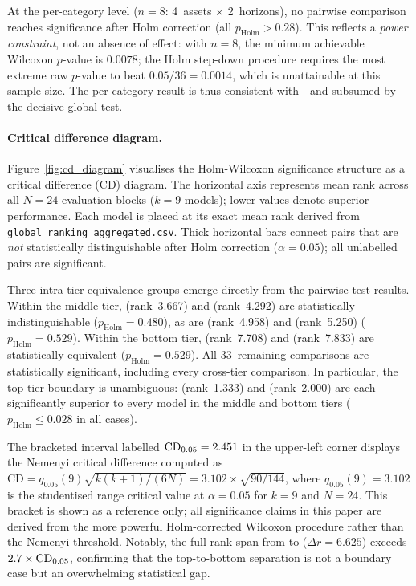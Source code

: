 At the per-category level ($n = 8$: 4~assets $\times$ 2~horizons), no pairwise comparison reaches significance after Holm correction (all $p_\text{Holm} > 0.28$).  This reflects a \emph{power constraint}, not an absence of effect: with $n = 8$, the minimum achievable Wilcoxon $p$-value is $0.0078$; the Holm step-down procedure requires the most extreme raw $p$-value to beat $0.05/36 = 0.0014$, which is unattainable at this sample size.  The per-category result is thus consistent with---and subsumed by---the decisive global test.

\paragraph{Critical difference diagram.}
Figure~\ref{fig:cd_diagram} visualises the Holm-Wilcoxon significance structure as a critical difference (CD) diagram.  The horizontal axis represents mean rank across all $N = 24$ evaluation blocks ($k = 9$ models); lower values denote superior performance.  Each model is placed at its exact mean rank derived from \texttt{global\_ranking\_aggregated.csv}.  Thick horizontal bars connect pairs that are \emph{not} statistically distinguishable after Holm correction ($\alpha = 0.05$); all unlabelled pairs are significant.

Three intra-tier equivalence groups emerge directly from the pairwise test results.  Within the middle tier, \itransformer (rank~3.667) and \timexer (rank~4.292) are statistically indistinguishable ($p_\text{Holm} = 0.480$), as are \dlinear (rank~4.958) and \nhits (rank~5.250) ($p_\text{Holm} = 0.529$).  Within the bottom tier, \timesnet (rank~7.708) and \autoformer (rank~7.833) are statistically equivalent ($p_\text{Holm} = 0.529$).  All 33~remaining comparisons are statistically significant, including every cross-tier comparison.  In particular, the top-tier boundary is unambiguous: \moderntcn (rank~1.333) and \patchtst (rank~2.000) are each significantly superior to every model in the middle and bottom tiers ($p_\text{Holm} \leq 0.028$ in all cases).

The bracketed interval labelled $\mathrm{CD}_{0.05} = 2.451$ in the upper-left corner displays the Nemenyi critical difference computed as $\mathrm{CD} = q_{0.05}(9)\sqrt{k(k+1)/(6N)} = 3.102 \times \sqrt{90/144}$, where $q_{0.05}(9) = 3.102$ is the studentised range critical value at $\alpha = 0.05$ for $k = 9$ and $N = 24$.  This bracket is shown as a reference only; all significance claims in this paper are derived from the more powerful Holm-corrected Wilcoxon procedure rather than the Nemenyi threshold.  Notably, the full rank span from \moderntcn to \lstm ($\Delta r = 6.625$) exceeds $2.7 \times \mathrm{CD}_{0.05}$, confirming that the top-to-bottom separation is not a boundary case but an overwhelming statistical gap.

